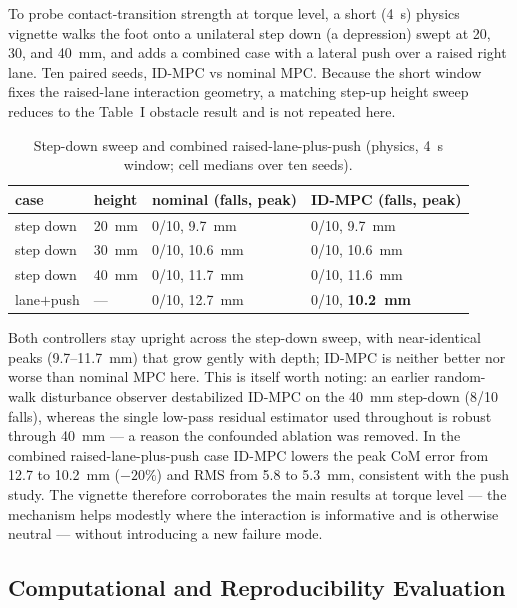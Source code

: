 \documentclass[journal]{IEEEtran}
\theoremstyle{plain}
\theoremstyle{definition}
\theoremstyle{remark}
\begin{document}
To probe contact-transition strength at torque level, a short (4~s) physics vignette walks the foot onto a unilateral step down (a depression) swept at 20, 30, and 40~mm, and adds a combined case with a lateral push over a raised right lane. Ten paired seeds, ID-MPC vs nominal MPC. Because the short window fixes the raised-lane interaction geometry, a matching step-up height sweep reduces to the Table~I obstacle result and is not repeated here.

\begin{table}[t]
\centering
\caption{Step-down sweep and combined raised-lane-plus-push (physics, 4~s window; cell medians over ten seeds).}
\label{tab:step}
\begin{tabular}{@{}llll@{}}
\toprule
case & height & nominal (falls, peak) & ID-MPC (falls, peak)\\
\midrule
step down & 20~mm & 0/10, 9.7~mm & 0/10, 9.7~mm\\
step down & 30~mm & 0/10, 10.6~mm & 0/10, 10.6~mm\\
step down & 40~mm & 0/10, 11.7~mm & 0/10, 11.6~mm\\
lane$+$push & --- & 0/10, 12.7~mm & 0/10, \textbf{10.2~mm}\\
\bottomrule
\end{tabular}
\end{table}

Both controllers stay upright across the step-down sweep, with near-identical peaks (9.7--11.7~mm) that grow gently with depth; ID-MPC is neither better nor worse than nominal MPC here. This is itself worth noting: an earlier random-walk disturbance observer destabilized ID-MPC on the 40~mm step-down (8/10 falls), whereas the single low-pass residual estimator used throughout is robust through 40~mm --- a reason the confounded ablation was removed. In the combined raised-lane-plus-push case ID-MPC lowers the peak CoM error from 12.7 to 10.2~mm ($-20\%$) and RMS from 5.8 to 5.3~mm, consistent with the push study. The vignette therefore corroborates the main results at torque level --- the mechanism helps modestly where the interaction is informative and is otherwise neutral --- without introducing a new failure mode.

\subsection{Computational and Reproducibility Evaluation}
\end{document}
